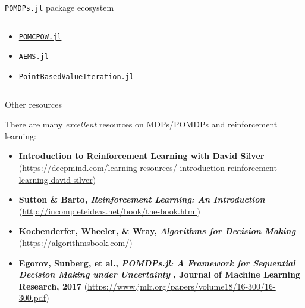 \begin{frame}[fragile]{\texttt{POMDPs.jl} package ecosystem}
\begin{columns}[T,onlytextwidth]
\begin{column}{0.32\linewidth}
{\begin{itemize}
            \item {\color{julia_red}\href{https://github.com/JuliaPOMDP/DeepQLearning.jl}{\texttt{POMCPOW.jl}}}
            \item {\color{julia_green}\href{https://github.com/JuliaPOMDP/Crux.jl}{\texttt{AEMS.jl}}}
            \item {\color{julia_purple}\href{https://github.com/JuliaPOMDP/POMDPStressTesting.jl}{\texttt{PointBasedValueIteration.jl}}}
        \end{itemize}
        }
    \end{column}
\end{columns}

\end{frame}


\begin{frame}[fragile]{Other resources}

There are many \textit{excellent} resources on MDPs/POMDPs and reinforcement learning:

{\scriptsize
\begin{itemize}
    \item \textbf{Introduction to Reinforcement Learning with David Silver} ({\color{julia_blue}\url{https://deepmind.com/learning-resources/-introduction-reinforcement-learning-david-silver}})
    \item \textbf{Sutton \& Barto, \textit{Reinforcement Learning: An Introduction}} ({\color{julia_blue}\url{http://incompleteideas.net/book/the-book.html}})
    \item \textbf{Kochenderfer, Wheeler, \& Wray, \textit{Algorithms for Decision Making}} ({\color{julia_blue}\url{https://algorithmsbook.com/}})
    \item \textbf{Egorov, Sunberg, et al., \textit{POMDPs.jl: A Framework for Sequential Decision Making under Uncertainty
}, Journal of Machine Learning Research, 2017} ({\color{julia_blue}\url{https://www.jmlr.org/papers/volume18/16-300/16-300.pdf}})
\end{itemize}
}

\end{frame}







